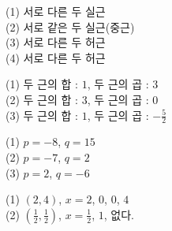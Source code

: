 \documentclass{oblivoir}
\begin{document}
\begin{minipage}{0.49\textwidth}
%
(1) 서로 다른 두 실근\\
(2) 서로 같은 두 실근(중근)\\
(3) 서로 다른 두 허근\\
(4) 서로 다른 두 허근

%
(1) 두 근의 합 : \(1\), 두 근의 곱 : \(3\)\\
(2) 두 근의 합 : \(3\), 두 근의 곱 : \(0\)\\
(3) 두 근의 합 : \(1\), 두 근의 곱 : \(-\frac52\)

%
(1) \(p=-8\), \(q=15\)\\
(2) \(p=-7\), \(q=2\)\\
(3) \(p=2\), \(q=-6\)

%
(1)  \((2,4)\),  \(x=2\),  \(0\),  \(0\), \(4\)\\
(2)  \((\frac12,\frac12)\),  \(x=\frac12\),  \(1\),  없다.
\end{minipage}
\end{document}
